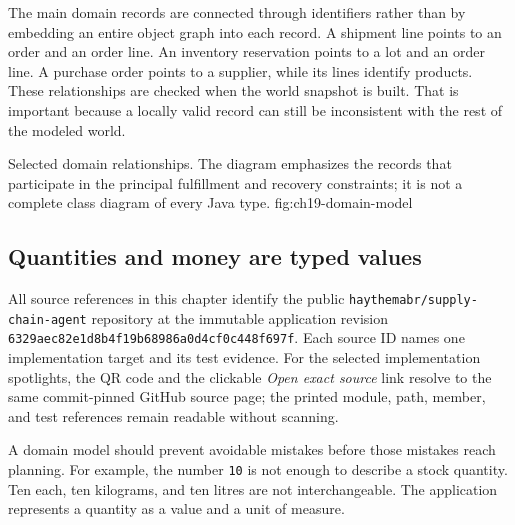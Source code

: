 The main domain records are connected through identifiers rather than by embedding an entire object graph into each record. A shipment line points to an order and an order line. An inventory reservation points to a lot and an order line. A purchase order points to a supplier, while its lines identify products. These relationships are checked when the world snapshot is built. That is important because a locally valid record can still be inconsistent with the rest of the modeled world.

  {Selected domain relationships. The diagram emphasizes the records that participate in the principal fulfillment and recovery constraints; it is not a complete class diagram of every Java type.}
  {fig:ch19-domain-model}

\subsection{Quantities and money are typed values}

All source references in this chapter identify the public \texttt{haythemabr/supply-chain-agent} repository at the immutable application revision \texttt{6329aec82e1d8b4f19b68986a0d4cf0c448f697f}. Each source ID names one implementation target and its test evidence. For the selected implementation spotlights, the QR code and the clickable \emph{Open exact source} link resolve to the same commit-pinned GitHub source page; the printed module, path, member, and test references remain readable without scanning.

A domain model should prevent avoidable mistakes before those mistakes reach planning. For example, the number \texttt{10} is not enough to describe a stock quantity. Ten each, ten kilograms, and ten litres are not interchangeable. The application represents a quantity as a value and a unit of measure.

